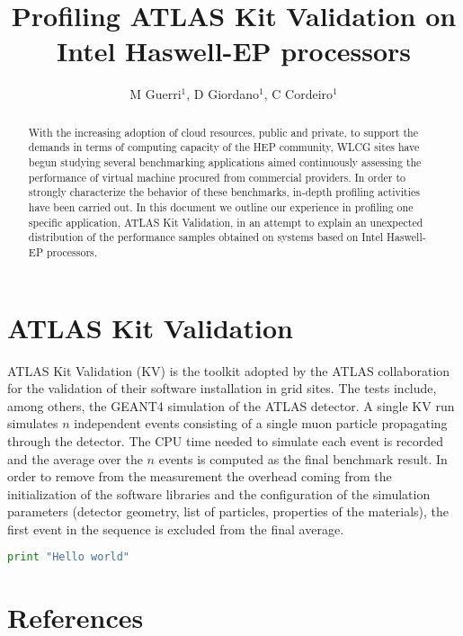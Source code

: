 \documentclass[a4paper]{jpconf}
\begin{document}
\title{Profiling ATLAS Kit Validation on Intel Haswell-EP processors}

\author{M Guerri$^1$, D Giordano$^1$, C Cordeiro$^1$}
\address{$^1$ CERN}



\begin{abstract}
With the increasing adoption of cloud resources, public and private, to support
the demands in terms of computing capacity of the HEP community, WLCG sites have begun 
studying several benchmarking applications aimed continuously assessing the 
performance of virtual machine procured from commercial providers. 
In order to strongly characterize the behavior of these benchmarks, in-depth
profiling activities have been carried out. In this document we outline
our experience in profiling one specific application, ATLAS Kit Validation, 
in an attempt to explain an unexpected distribution of the performance samples
obtained on systems based on Intel Haswell-EP processors.


\end{abstract}

\section{ATLAS Kit Validation}
ATLAS Kit Validation (KV) is the toolkit adopted by the ATLAS collaboration for the
validation of their software installation in grid sites. The tests include, among
others, the GEANT4 simulation of the ATLAS detector. A single KV run simulates
$n$ independent events consisting of a single muon particle propagating through
the detector. The CPU time needed to simulate each event is recorded and the 
average over the $n$ events is computed as the final benchmark result. In order to 
remove from the measurement the overhead coming from the initialization of the 
software libraries and the configuration of the simulation parameters (detector 
geometry, list of particles, properties of the materials), the first event in the 
sequence is excluded from the final average.  

\begin{lstlisting}[language=Python]
print "Hello world"
\end{lstlisting}


\section*{References}


\end{document}
